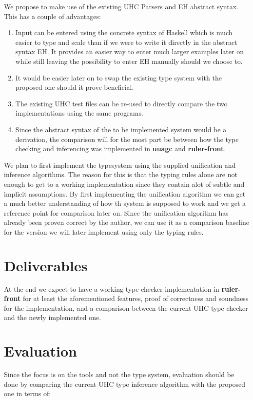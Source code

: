 \documentclass[12pt, a4paper, oneside]{article}
\begin{document}
We propose to make use of the existing UHC Parsers and EH abstract syntax. This has a couple of advantages:

\begin{enumerate}
\item Input can be entered using the concrete syntax of Haskell which is much easier to type and scale than if we were to write it directly in the abstract syntax EH. It provides an easier way to enter much larger examples later on while still leaving the possibility to enter EH manually should we choose to.
\item It would be easier later on to swap the existing type system with the proposed one should it prove beneficial.
\item The existing UHC test files can be re-used to directly compare the two implementations using the same programs.
\item Since the abstract syntax of the to be implemented system would be a derivation, the comparison will for the most part be between how the type checking and inferencing was implemented in \textbf{uuagc} and \textbf{ruler-front}.
\end{enumerate}

We plan to first implement the typesystem using the supplied unification and inference algorithms. The reason for this is that the typing rules alone are not enough to get to a working implementation since they contain alot of subtle and implicit assumptions. By first implementing the unification algorithm we can get a much better understanding of how th system is supposed to work and we get a reference point for comparison later on. Since the unification algorithm has already been proven correct by the author, we can use it as a comparison baseline for the version we will later implement using only the typing rules.
\section{Deliverables}
At the end we expect to have a working type checker implementation in \textbf{ruler-front} for at least the aforementioned features, proof of correctness and soundness for the implementation, and a comparison between the current UHC type checker and the newly implemented one.

\section{Evaluation}
Since the focus is on the tools and not the type system, evaluation should be done by comparing the current UHC type inference algorithm with the proposed one in terms of:
\end{document}
